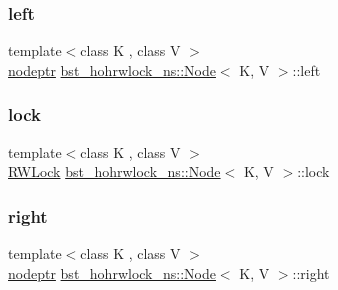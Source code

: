 \subsubsection{\texorpdfstring{left}{left}}
{\footnotesize\ttfamily template$<$class K , class V $>$ \\
\hyperlink{bst__rwlock__impl_8h_a04158d2a20768fe447133ff555823b05}{nodeptr} \hyperlink{classbst__hohrwlock__ns_1_1Node}{bst\+\_\+hohrwlock\+\_\+ns\+::\+Node}$<$ K, V $>$\+::left}

\mbox{\label{classbst__hohrwlock__ns_1_1Node_a7ef93a01efec42288517d581c3d0e856}} 
\subsubsection{\texorpdfstring{lock}{lock}}
{\footnotesize\ttfamily template$<$class K , class V $>$ \\
\hyperlink{classRWLock}{R\+W\+Lock} \hyperlink{classbst__hohrwlock__ns_1_1Node}{bst\+\_\+hohrwlock\+\_\+ns\+::\+Node}$<$ K, V $>$\+::lock}

\mbox{\label{classbst__hohrwlock__ns_1_1Node_a9d2e92f59341681a131ff00634f0a606}} 
\subsubsection{\texorpdfstring{right}{right}}
{\footnotesize\ttfamily template$<$class K , class V $>$ \\
\hyperlink{bst__rwlock__impl_8h_a04158d2a20768fe447133ff555823b05}{nodeptr} \hyperlink{classbst__hohrwlock__ns_1_1Node}{bst\+\_\+hohrwlock\+\_\+ns\+::\+Node}$<$ K, V $>$\+::right}

\mbox{\label{classbst__hohrwlock__ns_1_1Node_a6e74874a1b0a5058298e45b266b9a5dc}} 
